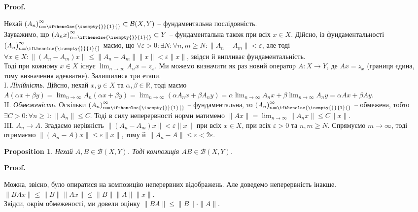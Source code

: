 \documentclass[a4paper, 10pt]{article}
\makeatletter
\theoremstyle{theoremdd}
\theoremstyle{theoremdd}
\theoremstyle{theoremdd}
\theoremstyle{theoremdd}
\theoremstyle{theoremdd}
\newtheorem{proposition}[theorem]{Proposition}
\theoremstyle{theoremdd}
\theoremstyle{theoremdd}
\theoremstyle{theoremdd}
\newcommand{\sequence}[2][]{\left({#2}\right)_{n=\ifthenelse{\isempty{#1}}{1}{#1}}^{\infty}}
\renewenvironment{proof}[1][Proof.\\]{\par
\pushQED{\hfill \qed}%
\normalfont \topsep6\p@\@plus6\p@\relax
\trivlist
\item\relax
{\bfseries
#1\@addpunct{.}}\hspace\labelsep\ignorespaces
}{%
\popQED\endtrivlist\@endpefalse
}
\makeatother
\begin{document}
\begin{proof}
Нехай $\sequence{A_n} \subset \mathcal{B}(X,Y)$ -- фундаментальна послідовність.\\ Зауважимо, що $\sequence{A_n x} \subset Y$ -- фундаментальна також при всіх $x \in X$. Дійсно, із фундаментальності $\sequence{A_n}$ маємо, що $\forall \varepsilon > 0: \exists N: \forall n,m \geq N: \|A_n-A_m\| < \varepsilon$, але тоді $\forall x \in X: \|(A_n-A_m)x\| \leq \|A_n-A_m\| \|x\| < \varepsilon \|x\|$, звідси й випливає фундаментальність.\\
Тоді при кожному $x \in X$ існує $\displaystyle\lim_{n \to \infty} A_n x = z_x$. Ми можемо визначити як раз новий оператор $A \colon X \to Y$, де $Ax = z_x$ (границя єдина, тому визначення адекватне). Залишилися три етапи.\\
I. \textit{Лінійність}. \quad Дійсно, нехай $x,y \in X$ та $\alpha,\beta \in \mathbb{R}$, тоді маємо\\
$A(\alpha x + \beta y) = \displaystyle\lim_{n \to \infty} A_n(\alpha x + \beta y) = \lim_{n \to \infty} (\alpha A_nx + \beta A_n y) = \alpha \lim_{n \to \infty} A_n x + \beta \lim_{n \to \infty} A_n y = \alpha Ax + \beta Ay$.\\
II. \textit{Обмеженість}. \quad Оскільки $\sequence{A_n}$ -- фундаментальна, то $\sequence{A_n}$ -- обмежена, тобто $\exists C > 0: \forall n \geq 1: \|A_n\| \leq C$. Тоді в силу неперервності норми матимемо $\|Ax\| = \displaystyle\lim_{n \to \infty} \|A_nx\| \leq C \|x\|$.\\
III. \textit{$A_n \to A$}. \quad Згадаємо нерівність $\|(A_n-A_m)x\| < \varepsilon \|x\|$ при всіх $x \in X$, при всіх $\varepsilon > 0$ та $n,m \geq N$. Спрямуємо $m \to \infty$, тоді отримаємо $\|(A_n-A)x\| \leq \varepsilon \|x\|$, тому й $\|A_n-A\| \leq \varepsilon < 2\varepsilon$.
\end{proof}

\begin{proposition}
Нехай $A,B \in \mathcal{B}(X,Y)$. Тоді композиція $AB \in \mathcal{B}(X,Y)$.
\end{proposition}

\begin{proof}
Можна, звісно, було опиратися на композицію неперервних відображень. Але доведемо неперервність інакше.\\
$\|BA x\| \leq \|B\| \|Ax\| \leq \|B\| \|A\| \|x\|$.\\
Звідси, окрім обмеженості, ми довели оцінку $\|BA\| \leq \|B\| \cdot \|A\|$.
\end{proof}
\end{document}
